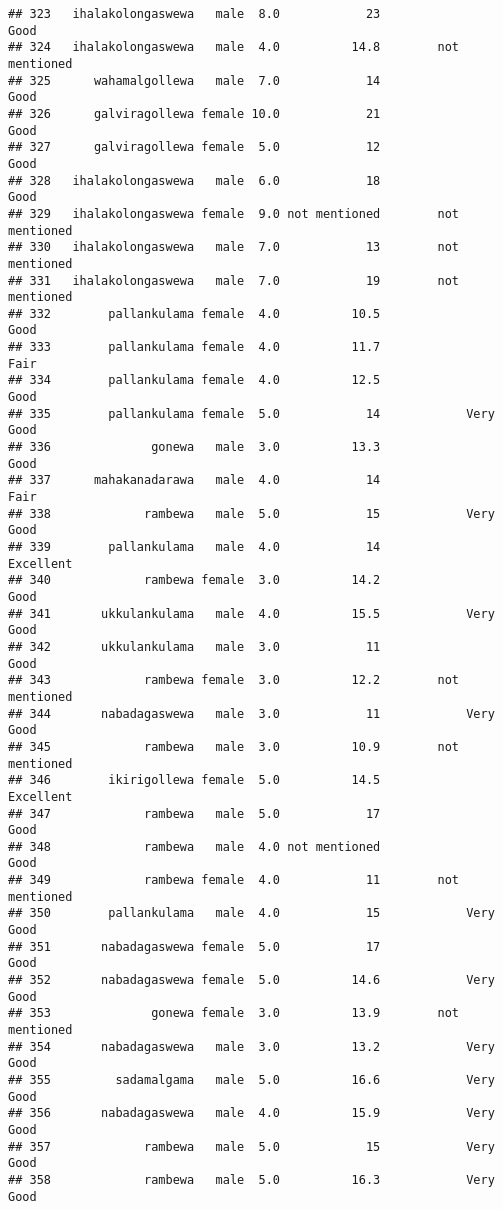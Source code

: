 \documentclass[
]{article}
\begin{document}
\begin{verbatim}
## 323   ihalakolongaswewa   male  8.0            23                 Good
## 324   ihalakolongaswewa   male  4.0          14.8        not mentioned
## 325      wahamalgollewa   male  7.0            14                 Good
## 326      galviragollewa female 10.0            21                 Good
## 327      galviragollewa female  5.0            12                 Good
## 328   ihalakolongaswewa   male  6.0            18                 Good
## 329   ihalakolongaswewa female  9.0 not mentioned        not mentioned
## 330   ihalakolongaswewa   male  7.0            13        not mentioned
## 331   ihalakolongaswewa   male  7.0            19        not mentioned
## 332        pallankulama female  4.0          10.5                 Good
## 333        pallankulama female  4.0          11.7                 Fair
## 334        pallankulama female  4.0          12.5                 Good
## 335        pallankulama female  5.0            14            Very Good
## 336              gonewa   male  3.0          13.3                 Good
## 337      mahakanadarawa   male  4.0            14                 Fair
## 338             rambewa   male  5.0            15            Very Good
## 339        pallankulama   male  4.0            14            Excellent
## 340             rambewa female  3.0          14.2                 Good
## 341       ukkulankulama   male  4.0          15.5            Very Good
## 342       ukkulankulama   male  3.0            11                 Good
## 343             rambewa female  3.0          12.2        not mentioned
## 344       nabadagaswewa   male  3.0            11            Very Good
## 345             rambewa   male  3.0          10.9        not mentioned
## 346        ikirigollewa female  5.0          14.5            Excellent
## 347             rambewa   male  5.0            17                 Good
## 348             rambewa   male  4.0 not mentioned                 Good
## 349             rambewa female  4.0            11        not mentioned
## 350        pallankulama   male  4.0            15            Very Good
## 351       nabadagaswewa female  5.0            17                 Good
## 352       nabadagaswewa female  5.0          14.6            Very Good
## 353              gonewa female  3.0          13.9        not mentioned
## 354       nabadagaswewa   male  3.0          13.2            Very Good
## 355         sadamalgama   male  5.0          16.6            Very Good
## 356       nabadagaswewa   male  4.0          15.9            Very Good
## 357             rambewa   male  5.0            15            Very Good
## 358             rambewa   male  5.0          16.3            Very Good

\end{verbatim}
\end{document}
